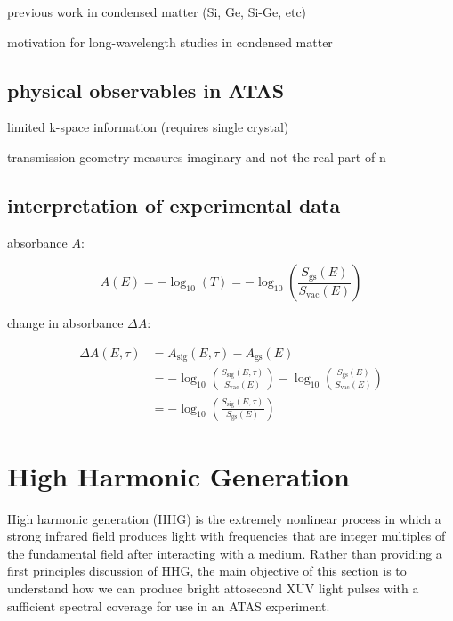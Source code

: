 previous work in condensed matter (Si, Ge, Si-Ge, etc)

motivation for long-wavelength studies in condensed matter

\subsection{physical observables in ATAS}
limited k-space information (requires single crystal)

transmission geometry measures imaginary and not the real part of n

\subsection{interpretation of experimental data}

absorbance $A$:

\begin{equation}
A(E) = - \log_{10} (T) = -\log_{10} \left( \frac{S_{\textrm{gs}}(E)}{ S_{\textrm{vac}} (E)} \right)
\label{eqn:absorbance}
\end{equation}

change in absorbance $\Delta A$:

\begin{align}
\Delta A (E, \tau) &= A_{\textrm{sig}}(E,\tau) - A_{\textrm{gs}} (E) \nonumber \\
&= -\log_{10} \left( \frac{S_{\textrm{sig}}(E, \tau)}{ S_{\textrm{vac}} (E)} \right) -\log_{10} \left( \frac{S_{\textrm{gs}}(E)}{ S_{\textrm{vac}} (E)} \right) \nonumber \\
&= -\log_{10} \left( \frac{S_{\textrm{sig}} (E, \tau)}{ S_{\textrm{gs}} (E)} \right)
\end{align}

\section{High Harmonic Generation}

High harmonic generation (HHG) is the extremely nonlinear process in which a strong infrared field produces light with frequencies that are integer multiples of the fundamental field after interacting with a medium. Rather than providing a first principles discussion of HHG, the main objective of this section is to understand how we can produce bright attosecond XUV light pulses with a sufficient spectral coverage for use in an ATAS experiment.


